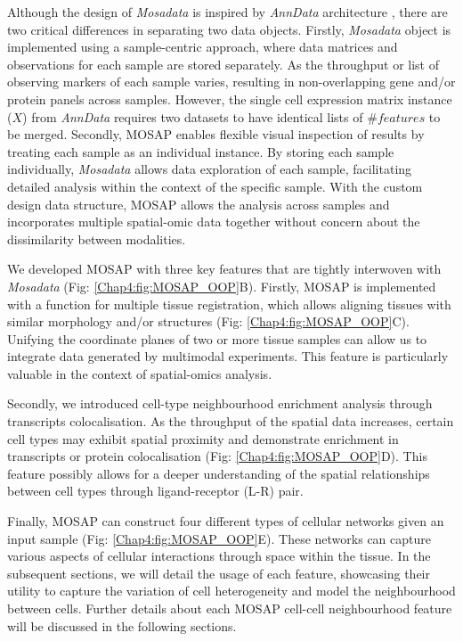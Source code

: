 Although the design of \textit{Mosadata} is inspired by \textit{AnnData} architecture \cite{wolf2018scanpy}, there are two critical differences in separating two data objects. Firstly, \textit{Mosadata} object is implemented using a sample-centric approach, where data matrices and observations for each sample are stored separately. As the throughput or list of observing markers of each sample varies, resulting in non-overlapping gene and/or protein panels across samples. However, the single cell expression matrix instance ($X$) from \textit{AnnData} requires two datasets to have identical lists of $\#features$ to be merged. Secondly, MOSAP enables flexible visual inspection of results by treating each sample as an individual instance. By storing each sample individually, \textit{Mosadata} allows data exploration of each sample, facilitating detailed analysis within the context of the specific sample. With the custom design data structure, MOSAP allows the analysis across samples and incorporates multiple spatial-omic data together without concern about the dissimilarity between modalities.

We developed MOSAP with three key features that are tightly interwoven with \textit{Mosadata} (Fig: \ref{Chap4:fig:MOSAP_OOP}B). Firstly, MOSAP is implemented with a function for multiple tissue registration, which allows aligning tissues with similar morphology and/or structures (Fig: \ref{Chap4:fig:MOSAP_OOP}C). Unifying the coordinate planes of two or more tissue samples can allow us to integrate data generated by multimodal experiments. This feature is particularly valuable in the context of spatial-omics analysis.

Secondly, we introduced cell-type neighbourhood enrichment analysis through transcripts colocalisation. As the throughput of the spatial data increases, certain cell types may exhibit spatial proximity and demonstrate enrichment in transcripts or protein colocalisation (Fig: \ref{Chap4:fig:MOSAP_OOP}D). This feature possibly allows for a deeper understanding of the spatial relationships between cell types through ligand-receptor (L-R) pair.

Finally, MOSAP can construct four different types of cellular networks given an input sample (Fig: \ref{Chap4:fig:MOSAP_OOP}E). These networks can capture various aspects of cellular interactions through space within the tissue. In the subsequent sections, we will detail the usage of each feature, showcasing their utility to capture the variation of cell heterogeneity and model the neighbourhood between cells. Further details about each MOSAP cell-cell neighbourhood feature will be discussed in the following sections. 

